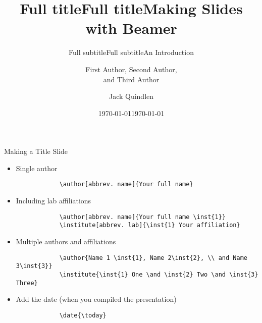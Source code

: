 \title[]{Full title} 
\subtitle[]{Full subtitle} 
\author{}
\institute{} 
\date{} 
\frame{\titlepage}

\begin{frame}[fragile,t]{Making a Title Slide}
	\begin{itemize}
		\item Single author
		\begin{verbatim}
			\author[abbrev. name]{Your full name}
		\end{verbatim}
\vspace{0.2in}
		\item Including lab affiliations
		\begin{verbatim}
			\author[abbrev. name]{Your full name \inst{1}}
			\institute[abbrev. lab]{\inst{1} Your affiliation}
		\end{verbatim}
\vspace{0.2in}
		\item Multiple authors and affiliations
		{\small
		\begin{verbatim}
			\author{Name 1 \inst{1}, Name 2\inst{2}, \\ and Name 3\inst{3}}
			\institute{\inst{1} One \and \inst{2} Two \and \inst{3} Three}
		\end{verbatim}
		}
\vspace{0.2in}
		\item Add the date (when you compiled the presentation)
		\begin{verbatim}
			\date{\today}
		\end{verbatim}
	\end{itemize}
\end{frame}

\title[Abbrev. title]{Full title} 
\subtitle[]{Full subtitle} 
\author[Abbrev. name]{First Author, Second Author, \\ and Third Author}
\date{\today} 
\frame{\titlepage}

\title[Beamer Slides]{Making Slides with Beamer} %
\subtitle[]{An Introduction} %
\author[J. Quindlen]{Jack Quindlen } %
\date{\today} %